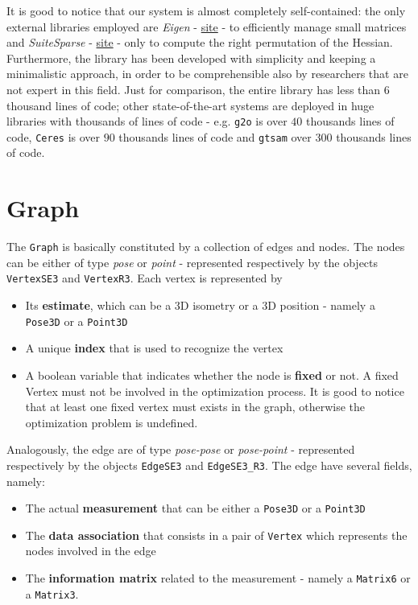 It is good to notice that our system is almost completely self-contained: the only external libraries employed are \textit{Eigen} - \hyperref{http://eigen.tuxfamily.org}{}{}{site} -  to efficiently manage small matrices  and \textit{SuiteSparse}  - \hyperref{http://faculty.cse.tamu.edu/davis/suitesparse.html}{}{}{site} - only to compute the right permutation of the Hessian. Furthermore, the library has been developed with simplicity and keeping a minimalistic approach, in order to be comprehensible also by researchers that are not expert in this field. Just for comparison, the entire library has less than $6$ thousand lines of code; other state-of-the-art systems are deployed in huge libraries with thousands of lines of code - e.g. \texttt{g2o} \cite{kummerle2011g} is over $40$ thousands lines of code, \texttt{Ceres} \cite{ceres-solver} is over $90$ thousands lines of code and \texttt{gtsam} \cite{dellaert2012gtsam} over $300$ thousands lines of code.

\section{Graph}\label{sec:graph_implementation}
The \texttt{Graph} is basically constituted by a collection of edges and nodes. The nodes can be either of type \textit{pose} or \textit{point} - represented respectively by the objects \texttt{VertexSE3} and \texttt{VertexR3}. Each vertex is represented by

\begin{itemize}
    \item Its \textbf{estimate}, which can be a 3D isometry or a 3D position - namely a \texttt{Pose3D} or a \texttt{Point3D}
    \item A unique \textbf{index} that is used to recognize the vertex
    \item A boolean variable that indicates whether the node is \textbf{fixed} or not. A fixed Vertex must not be involved in the optimization process. It is good to notice that at least one fixed vertex must exists in the graph, otherwise the optimization problem is undefined.
\end{itemize}

Analogously, the edge are of type \textit{pose-pose} or \textit{pose-point} - represented respectively by the objects \texttt{EdgeSE3} and \texttt{EdgeSE3\_R3}. The edge have several fields, namely:

\begin{itemize}
    \item The actual \textbf{measurement} that can be either a \texttt{Pose3D} or a \texttt{Point3D}
    \item The \textbf{data association} that consists in a pair of \texttt{Vertex} which represents the nodes involved in the edge
    \item The \textbf{information matrix} related to the measurement - namely a \texttt{Matrix6} or a \texttt{Matrix3}.
\end{itemize}

